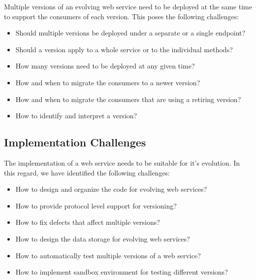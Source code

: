 \documentclass[runningheads,a4paper]{llncs}
\begin{document}
Multiple versions of an evolving web service need to be deployed at the same time to support the consumers of each version. This poses the following challenges:
\begin{itemize}
  \item Should multiple versions be deployed under a separate or a single endpoint?
  \item Should a version apply to a whole service or to the individual methods?
  \item How many versions need to be deployed at any given time?
  \item How and when to migrate the consumers to a newer version?
  \item How and when to migrate the consumers that are using a retiring version?
  \item How to identify and interpret a version?
\end{itemize}


\subsection{Implementation Challenges} %
\label{sub:implementation_challenges}

The implementation of a web service needs to be suitable for it’s evolution. In this regard, we have identified the following challenges:
\begin{itemize}
  \item How to design and organize the code for evolving web services?
  \item How to provide protocol level support for versioning?
  \item How to fix defects that affect multiple versions?
  \item How to design the data storage for evolving web services?
  \item How to automatically test multiple versions of a web service?
  \item How to implement sandbox environment for testing different versions?
\end{itemize}

\end{document}
